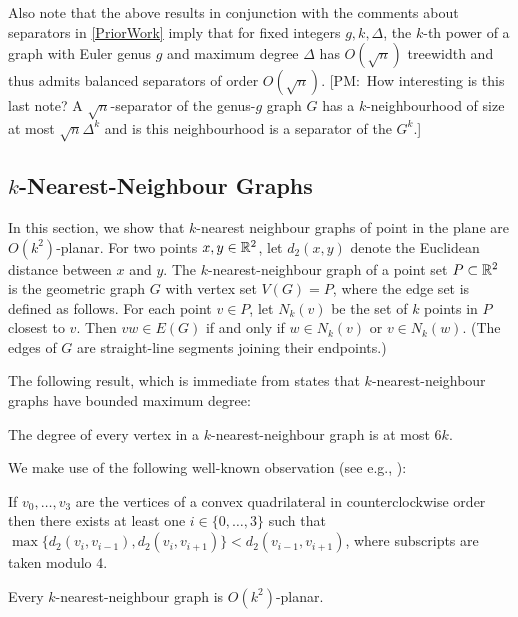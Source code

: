 \documentclass{patmorin}
\newcommand{\note}[2]{{\color{red}[#1:~#2]}}
\renewcommand{\le}{\leqslant}
\begin{document}
Also note that the above results in conjunction with the comments about separators in \cref{PriorWork} imply that for fixed integers $g,k,\Delta$, the $k$-th power of a graph with Euler genus $g$ and maximum degree $\Delta$ has $O(\sqrt{n})$ treewidth  and thus admits balanced separators of order $O(\sqrt{n})$.  \note{PM}{How interesting is this last note?  A $\sqrt{n}$-separator of the genus-$g$ graph $G$ has a $k$-neighbourhood of size at most $\sqrt{n}\Delta^k$ and is this neighbourhood is a separator of the $G^k$.}

\subsection{$k$-Nearest-Neighbour Graphs}

In this section, we show that $k$-nearest neighbour graphs of point in the plane are $O(k^2)$-planar.  For two points $x,y\in\mathbb{R}^2$, let $d_2(x,y)$ denote the Euclidean distance between $x$ and $y$. The $k$-nearest-neighbour graph of a point set $P\subset\mathbb{R}^2$ is the geometric graph $G$ with vertex set $V(G)=P$, where the edge set is defined as follows. For each point $v\in P$, let $N_k(v)$ be the set of $k$ points in $P$ closest to $v$. Then $vw\in E(G)$ if and only if $w\in N_k(v)$ or $v\in N_k(w)$. 
(The edges of $G$ are straight-line segments joining their endpoints.)

The following result, which is immediate from \citet[Corollary~4.2.6]{abrego.munroy.ea:on} states that $k$-nearest-neighbour graphs have bounded maximum degree:
\begin{lem}
\label{k-nn-max-degree}
The degree of every vertex in a $k$-nearest-neighbour graph is at most $6k$.
\end{lem}

We make use of the following well-known observation (see e.g., \citet[Lemma~2]{bose.morin.ea:routing}):
\begin{obs}
\label{convex}
If $v_0,\ldots,v_3$ are the vertices of a convex quadrilateral in counterclockwise order then there exists at least one $i\in\{0,\ldots,3\}$ such that $\max\{d_2(v_i,v_{i-1}), d_2(v_i,v_{i+1})\} < d_2(v_{i-1},v_{i+1})$, where subscripts are taken modulo 4.
\end{obs}

\begin{lem}
\label{nearest-neighbour}
  Every $k$-nearest-neighbour graph is $O(k^2)$-planar.
\end{lem}
\end{document}
